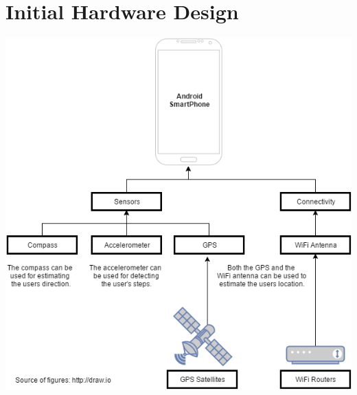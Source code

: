 \documentclass{scrreprt}
\begin{document}
	\section{Initial Hardware Design}
	\includegraphics[width=\textwidth]{hwdesign.png}
\pagebreak
\end{document}
